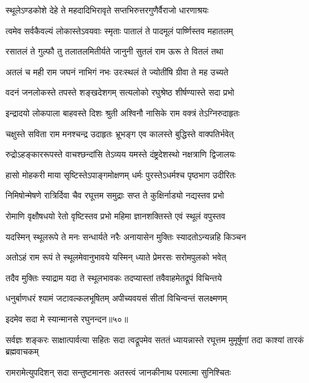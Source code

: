 \twolineshloka
{स्थूलेऽण्डकोशे देहे ते महदादिभिरावृते}
{सप्तभिरुत्तरगुणैर्वैराजो धारणाश्रयः} %

\twolineshloka
{त्वमेव सर्वकैवल्यं लोकास्तेऽवयवाः स्मृताः}
{पातालं ते पादमूलं पार्ष्णिस्तव महातलम्} %

\twolineshloka
{रसातलं ते गुल्फौ तु तलातलमितीर्यते}
{जानुनी सुतलं राम ऊरू ते वितलं तथा} %

\twolineshloka
{अतलं च मही राम जघनं नाभिगं नभः}
{उरःस्थलं ते ज्योतींषि ग्रीवा ते मह उच्यते} %

\twolineshloka
{वदनं जनलोकस्ते तपस्ते शङ्खदेशगम्}
{सत्यलोको रघुश्रेष्ठ शीर्षण्यास्ते सदा प्रभो} %

\twolineshloka
{इन्द्रादयो लोकपाला बाहवस्ते दिशः श्रुती}
{अश्विनौ नासिके राम वक्त्रं तेऽग्निरुदाहृतः} %

\twolineshloka
{चक्षुस्ते सविता राम मनश्चन्द्र उदाहृतः}
{भ्रूभङ्ग एव कालस्ते बुद्धिस्ते वाक्पतिर्भवेत्} %

\twolineshloka
{रुद्रोऽहङ्काररूपस्ते वाचश्छन्दांसि तेऽव्यय}
{यमस्ते दंष्ट्रदेशस्थो नक्षत्राणि द्विजालयः} %

\twolineshloka
{हासो मोहकरी माया सृष्टिस्तेऽपाङ्गमोक्षणम्}
{धर्मः पुरस्तेऽधर्मश्च पृष्ठभाग उदीरितः} %

\twolineshloka
{निमिषोन्मेषणे रात्रिर्दिवा चैव रघूत्तम}
{समुद्राः सप्त ते कुक्षिर्नाड्यो नद्यस्तव प्रभो} %

\twolineshloka
{रोमाणि वृक्षौषधयो रेतो वृष्टिस्तव प्रभो}
{महिमा ज्ञानशक्तिस्ते एवं स्थूलं वपुस्तव} %

\twolineshloka
{यदस्मिन् स्थूलरूपे ते मनः सन्धार्यते नरैः}
{अनायासेन मुक्तिः स्यादतोऽन्यन्नहि किञ्चन} %

\twolineshloka
{अतोऽहं राम रूपं ते स्थूलमेवानुभावये}
{यस्मिन् ध्याते प्रेमरसः सरोमपुलको भवेत्} %

\twolineshloka
{तदैव मुक्तिः स्याद्राम यदा ते स्थूलभावकः}
{तदप्यास्तां तवैवाहमेतद्रूपं विचिन्तये} %

\twolineshloka
{धनुर्बाणधरं श्यामं जटावल्कलभूषितम्}
{अपीच्यवयसं सीतां विचिन्वन्तं सलक्ष्मणम्} %

{इदमेव सदा मे स्यान्मानसे रघुनन्दन॥५०॥} %


\threelineshloka
{सर्वज्ञः शङ्करः साक्षात्पार्वत्या सहितः सदा}
{त्वद्रूपमेव सततं ध्यायन्नास्ते रघूत्तम}
{मुमूर्षूणां तदा काश्यां तारकं ब्रह्मवाचकम्} %

\twolineshloka
{रामरामेत्युपदिशन् सदा सन्तुष्टमानसः}
{अतस्त्वं जानकीनाथ परमात्मा सुनिश्चितः} %

